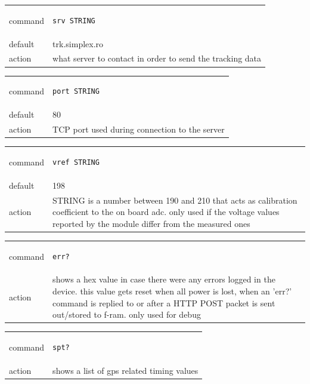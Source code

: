\documentclass[a4paper,twoside]{refart}
\begin{document}
\begin{tabular}{ |l|p{8cm}| }
    \hline
        command & 
\begin{lstlisting}
srv STRING
\end{lstlisting} \\
        default & trk.simplex.ro \\
        action & 
what server to contact in order to send the tracking data \\ \hline
\end{tabular}


\begin{tabular}{ |l|p{8cm}| }
    \hline
        command & 
\begin{lstlisting}
port STRING
\end{lstlisting} \\
        default & 80 \\
        action & 
TCP port used during connection to the server  \\ \hline
\end{tabular}


\begin{tabular}{ |l|p{8cm}| }
    \hline
        command & 
\begin{lstlisting}
vref STRING
\end{lstlisting} \\
        default & 198 \\
        action & 
STRING is a number between 190 and 210 that acts as calibration coefficient to the on board \gls{adc}. only used if the voltage values reported by the module differ from the measured ones \\ \hline
\end{tabular}


\begin{tabular}{ |l|p{8cm}| }
    \hline
        command & 
\begin{lstlisting}
err?
\end{lstlisting} \\
        action & 
shows a hex value in case there were any errors logged in the device. this value gets reset when all power is lost, when an 'err?' command is replied to or after a HTTP POST packet is sent out/stored to \gls{f-ram}. only used for debug  \\ \hline
\end{tabular}

\begin{tabular}{ |l|p{8cm}| }
    \hline
        command & 
\begin{lstlisting}
spt?
\end{lstlisting} \\
        action & 
shows a list of gps related timing values\\ \hline
\end{tabular}
\end{document}
